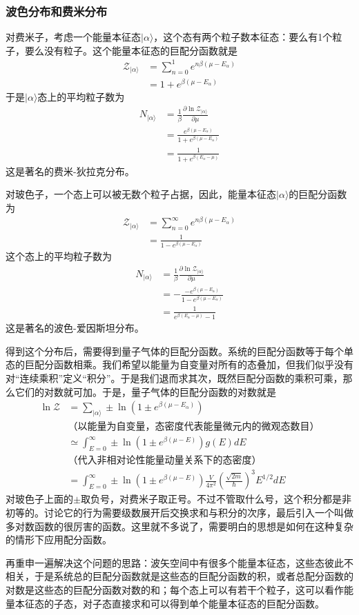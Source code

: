 \documentclass[a4paper,11pt]{ctexart}
\newcommand{\bea}{\begin{equation}\begin{aligned}}
\newcommand{\eea}{\end{aligned}\end{equation}}
\newcommand{\red}{\color{red}}
\newcommand{\grandz}{\mathcal{Z}}
\begin{document}
\subsubsection{波色分布和费米分布}
对费米子，考虑一个能量本征态$|\alpha \rangle$，这个态有两个粒子数本征态：要么有1个粒子，要么没有粒子。这个能量本征态的巨配分函数就是
\bea
\grandz_{|\alpha \rangle} &= \sum_{n=0}^1 e^{n\beta(\mu - E_\alpha)} \\
&= 1+ e^{\beta(\mu - E_\alpha)}
\eea
于是$|\alpha \rangle$态上的平均粒子数为
\bea
N_{|\alpha \rangle} &= \frac{1}{\beta} \frac{\partial \ln \grandz_{|\alpha \rangle}}{\partial \mu} \\
&=\frac{e^{\beta(\mu - E_\alpha)}}{1+e^{\beta(\mu - E_\alpha)}} \\
&= \frac{1}{1+e^{\beta(E_\alpha - \mu)}}
\eea
这是著名的{\red 费米-狄拉克分布}。
\par
对玻色子，一个态上可以被无数个粒子占据，因此，能量本征态$|\alpha \rangle$的巨配分函数为
\bea \label{bez}
\grandz_{|\alpha \rangle} &= \sum_{n=0}^\infty e^{n\beta(\mu - E_\alpha)} \\
&= \frac{1}{1- e^{\beta(\mu - E_\alpha)}}
\eea
这个态上的平均粒子数为
\bea
N_{|\alpha \rangle} &= \frac{1}{\beta} \frac{\partial \ln \grandz_{|\alpha \rangle}}{\partial \mu} \\
&=-\frac{-e^{\beta(\mu - E_\alpha)}}{1-e^{\beta(\mu - E_\alpha)}} \\
&= \frac{1}{ e^{\beta(E_\alpha - \mu)} - 1}
\eea
这是著名的{\red 波色-爱因斯坦分布}。
\par
得到这个分布后，需要得到量子气体的巨配分函数。系统的巨配分函数等于每个单态的巨配分函数相乘。我们希望以能量为自变量对所有的态叠加，但我们似乎没有对“连续乘积”定义“积分”。于是我们退而求其次，既然巨配分函数的乘积可乘，那么它们的对数就可加。于是，量子气体的巨配分函数的对数就是
\bea
\ln \grandz &= \sum_{|\alpha \rangle}\pm \ln (1 \pm e^{\beta(\mu - E_\alpha )}) \\
&\text{（以能量为自变量，态密度代表能量微元内的微观态数目）} \\
&\simeq \int_{E=0}^\infty \pm \ln (1 \pm e^{\beta(\mu - E)})g(E)dE \\
& \text{（代入非相对论性能量动量关系下的态密度）} \\
&=\int_{E=0}^\infty \pm \ln (1 \pm e^{\beta(\mu - E)})\frac{V}{4\pi^2} (\frac{\sqrt{2m}}{\hbar})^3 E^{1/2} dE
\eea
对玻色子上面的$\pm$取负号，对费米子取正号。不过不管取什么号，这个积分都是非初等的。讨论它的行为需要级数展开后交换求和与积分的次序，最后引入一个叫做多对数函数的很厉害的函数。这里就不多说了，需要明白的思想是如何在这种复杂的情形下应用配分函数。
\par
再重申一遍解决这个问题的思路：波矢空间中有很多个能量本征态，这些态彼此不相关，于是系统总的巨配分函数就是这些态的巨配分函数的积，或者总配分函数的对数是这些态的巨配分函数对数的和；每个态上可以有若干个粒子，这可以看作能量本征态的子态，对子态直接求和可以得到单个能量本征态的巨配分函数。
\end{document}
